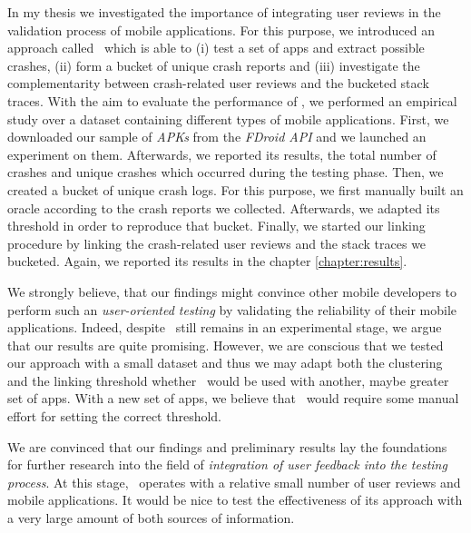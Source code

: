 \label{chapter:conclusion}
In my thesis we investigated the importance of integrating user reviews in the validation process of mobile applications. 
For this purpose, we introduced an approach called \toolname\ which is able to (i) test a set of apps and extract possible crashes, (ii) form a bucket of unique crash reports and 
(iii) investigate the complementarity between crash-related user reviews and the bucketed stack traces. 
With the aim to evaluate the performance of \toolname, we performed an empirical study 
over a dataset containing different types of mobile applications. 
First, we downloaded our sample of \textit{APKs} from the \textit{FDroid API} and we launched an experiment on them. 
Afterwards, we reported its results, \ie the total number of crashes and unique crashes which occurred during the testing phase. 
Then, we created a bucket of unique crash logs. For this purpose, we first manually built an oracle according to the crash reports we collected. 
Afterwards, we adapted its threshold in order to reproduce that bucket. 
Finally, we started our linking procedure by linking the crash-related user reviews and the stack traces we bucketed. 
Again, we reported its results in the chapter \ref{chapter:results}. 
 
 
We strongly believe, that our findings might convince other mobile developers to perform such an \textit{user-oriented testing} by validating the reliability of their mobile applications. 
Indeed, despite \toolname\ still remains in an experimental stage, we argue that our results are quite promising. 
However, we are conscious that we tested our approach with a small dataset and thus we may adapt both the clustering and the linking threshold whether \toolname\ would be used with another, maybe greater set of apps. 
With a new set of apps, we believe that \toolname\ would require some manual effort for setting the correct threshold. 

We are convinced that our findings and preliminary results lay the foundations for further research  into the field of \textit{integration of user feedback into the testing process}. 
At this stage, \toolname\ operates with a relative small number of user reviews and mobile applications. It would be nice to test the effectiveness of its approach with a very large amount of both sources of information. \\

